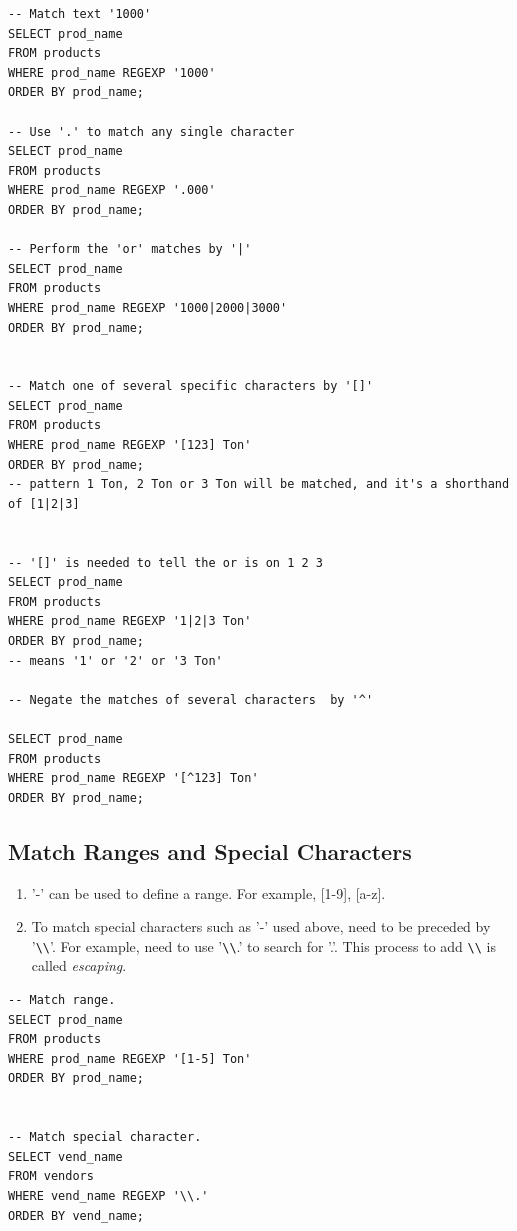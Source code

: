\documentclass[12pt,oneside,a4paper]{article}
\begin{document}
\begin{lstlisting}
-- Match text '1000'
SELECT prod_name 
FROM products 
WHERE prod_name REGEXP '1000'
ORDER BY prod_name;

-- Use '.' to match any single character 
SELECT prod_name 
FROM products 
WHERE prod_name REGEXP '.000'
ORDER BY prod_name;

-- Perform the 'or' matches by '|'
SELECT prod_name 
FROM products 
WHERE prod_name REGEXP '1000|2000|3000'
ORDER BY prod_name;


-- Match one of several specific characters by '[]'
SELECT prod_name 
FROM products 
WHERE prod_name REGEXP '[123] Ton'
ORDER BY prod_name;
-- pattern 1 Ton, 2 Ton or 3 Ton will be matched, and it's a shorthand of [1|2|3]


-- '[]' is needed to tell the or is on 1 2 3 
SELECT prod_name 
FROM products 
WHERE prod_name REGEXP '1|2|3 Ton'
ORDER BY prod_name;
-- means '1' or '2' or '3 Ton' 

-- Negate the matches of several characters  by '^'

SELECT prod_name 
FROM products 
WHERE prod_name REGEXP '[^123] Ton'
ORDER BY prod_name;

\end{lstlisting}


\subsection{Match Ranges and Special Characters}
\begin{enumerate}
\item '-' can be used to define a range. For example, [1-9], [a-z].

\item To match special characters such as '-' used above, need to be preceded by '\verb|\\|'. For example, need to use '\verb|\\|.' to search for '.'. This process to add \verb|\\| is called \emph{escaping}.
\end{enumerate}

\begin{lstlisting}
-- Match range.
SELECT prod_name 
FROM products 
WHERE prod_name REGEXP '[1-5] Ton'
ORDER BY prod_name;


-- Match special character. 
SELECT vend_name 
FROM vendors 
WHERE vend_name REGEXP '\\.'
ORDER BY vend_name;
\end{lstlisting}
\FloatBarrier
\end{document}
